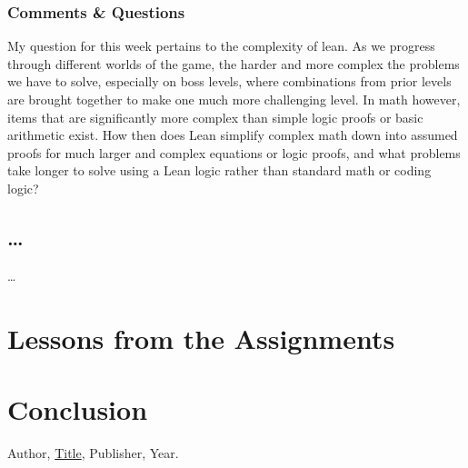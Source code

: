 \documentclass{article}
\theoremstyle{theorem}
\theoremstyle{definition}
\theoremstyle{remark}
\begin{document}
\subsubsection*{Comments \& Questions}
My question for this week pertains to the complexity of lean. As we progress through different worlds of the game, the harder and more complex the problems we have to solve, especially on boss levels, where combinations from prior levels are brought together to make one much more challenging level. In math however, items that are significantly more complex than simple logic proofs or basic arithmetic exist. How then does Lean simplify complex math down into assumed proofs for much larger and complex equations or logic proofs, and what problems take longer to solve using a Lean logic rather than standard math or coding logic?

\subsection{\ldots} 

\ldots

\section{Lessons from the Assignments}





\section{Conclusion}\label{conclusion}


\begin{thebibliography}{99}
 Author, \href{https://en.wikipedia.org/wiki/LaTeX}{Title}, Publisher, Year.
\end{thebibliography}
\end{document}
